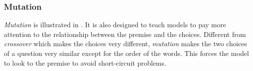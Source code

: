 

\subsubsection{Mutation}
\label{sec:mutate}

\textit{Mutation} is illustrated in . 
It is also designed to teach models 
to pay more attention to the relationship between the premise and the choices. 
Different from \textit{crossover} which makes the choices very different, 
\textit{mutation} makes the two choices of a question very similar except for the 
order of the words. This forces the model to look to the premise to avoid short-circuit problems.

